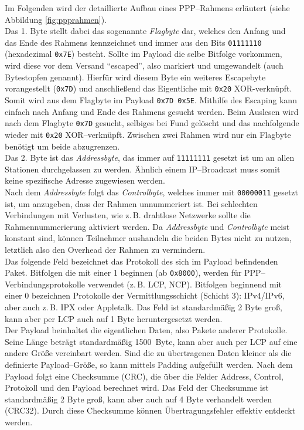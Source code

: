 \documentclass[journal,11pt]{IEEEtran}
\begin{document}
Im Folgenden wird der detaillierte Aufbau eines PPP--Rahmens erläutert (siehe Abbildung \ref{fig:ppprahmen}).\\
Das 1. Byte stellt dabei das sogenannte \textit{Flagbyte} dar, welches den Anfang und das Ende des Rahmens kennzeichnet und immer aus den Bits \texttt{01111110} (hexadezimal \texttt{0x7E}) besteht. Sollte im Payload die selbe Bitfolge vorkommen, wird diese vor dem Versand ``escaped'', also markiert und umgewandelt (auch Bytestopfen genannt). Hierfür wird diesem Byte ein weiteres Escapebyte vorangestellt (\texttt{0x7D}) und anschließend das Eigentliche mit \texttt{0x20} XOR-verknüpft. Somit wird aus dem Flagbyte im Payload \texttt{0x7D 0x5E}. Mithilfe des Escaping kann einfach nach Anfang und Ende des Rahmens gesucht werden. Beim Auslesen wird nach dem Flagbyte \texttt{0x7D} gesucht, selbiges bei Fund gelöscht und das nachfolgende wieder mit \texttt{0x20} XOR--verknüpft. Zwischen zwei Rahmen wird nur ein Flagbyte benötigt um beide abzugrenzen.\\
Das 2. Byte ist das \textit{Addressbyte}, das immer auf \texttt{11111111} gesetzt ist um an allen Stationen durchgelassen zu werden. Ähnlich einem IP--Broadcast muss somit keine spezifische Adresse zugewiesen werden.\\
Nach dem \textit{Addressbyte} folgt das \textit{Controlbyte}, welches immer mit \texttt{00000011} gesetzt ist, um anzugeben, dass der Rahmen unnummeriert ist. Bei schlechten Verbindungen mit Verlusten, wie z.\,B. drahtlose Netzwerke sollte die Rahmennummerierung aktiviert werden. Da \textit{Addressbyte} und \textit{Controlbyte} meist konstant sind, können Teilnehmer aushandeln die beiden Bytes nicht zu nutzen, letztlich also den Overhead der Rahmen zu vermindern.\\
Das folgende Feld bezeichnet das Protokoll des sich im Payload befindenden Paket. Bitfolgen die mit einer 1 beginnen (ab \texttt{0x8000}), werden für PPP--Verbindungsprotokolle verwendet (z.\,B. LCP, NCP). Bitfolgen beginnend mit einer 0 bezeichnen Protokolle der Vermittlungsschicht (Schicht 3): IPv4/IPv6, aber auch z.\,B. IPX oder Appletalk. Das Feld ist standardmäßig 2 Byte groß, kann aber per LCP auch auf 1 Byte heruntergesetzt werden.\\
Der Payload beinhaltet die eigentlichen Daten, also Pakete anderer Protokolle. Seine Länge beträgt standardmäßig 1500~Byte, kann aber auch per LCP auf eine andere Größe vereinbart werden. Sind die zu übertragenen Daten kleiner als die definierte Payload--Größe, so kann mittels Padding aufgefüllt werden.
Nach dem Payload folgt eine Checksumme (CRC), die über die Felder Address, Control, Protokoll und den Payload berechnet wird. Das Feld der Checksumme ist standardmäßig 2 Byte groß, kann aber auch auf 4 Byte verhandelt werden (CRC32). Durch diese Checksumme können Übertragungsfehler effektiv entdeckt werden.
\end{document}
